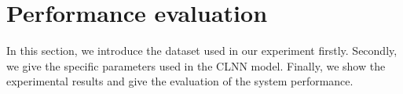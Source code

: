 \documentclass[conference]{IEEEtran}
\begin{document}







\section{Performance evaluation}
\label{sec:performanceevaluation}
In this section, we introduce the dataset used in our experiment firstly. Secondly, we give the specific parameters used in the CLNN model. Finally, we show the experimental results and give the evaluation of the system performance.
\end{document}
